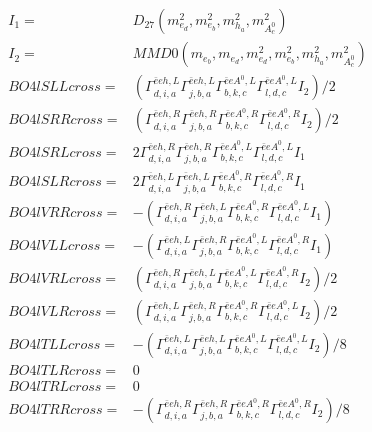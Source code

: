 \documentclass[A4,landscape]{article}
\begin{document}
\begin{align} 
I_1 = & D_{27}(m^2_{e_{{d}}}, m^2_{e_{{b}}}, m^2_{h_{{a}}}, m^2_{A^0_{{c}}}) \\ 
I_2 = & MMD0(m_{e_{{b}}}, m_{e_{{d}}}, m^2_{e_{{d}}}, m^2_{e_{{b}}}, m^2_{h_{{a}}}, m^2_{A^0_{{c}}}) \\ 
  BO4lSLLcross= & ( \Gamma^{\bar{e}e h ,L}_{d, i, a} \Gamma^{\bar{e}e h ,L}_{j, b, a} \Gamma^{\bar{e}e A^0 ,L}_{b, k, c} \Gamma^{\bar{e}e A^0 ,L}_{l, d, c} I_2)/2 \\ 
  BO4lSRRcross= & ( \Gamma^{\bar{e}e h ,R}_{d, i, a} \Gamma^{\bar{e}e h ,R}_{j, b, a} \Gamma^{\bar{e}e A^0 ,R}_{b, k, c} \Gamma^{\bar{e}e A^0 ,R}_{l, d, c} I_2)/2 \\ 
  BO4lSRLcross= & 2  \Gamma^{\bar{e}e h ,R}_{d, i, a} \Gamma^{\bar{e}e h ,R}_{j, b, a} \Gamma^{\bar{e}e A^0 ,L}_{b, k, c} \Gamma^{\bar{e}e A^0 ,L}_{l, d, c} I_1 \\ 
  BO4lSLRcross= & 2  \Gamma^{\bar{e}e h ,L}_{d, i, a} \Gamma^{\bar{e}e h ,L}_{j, b, a} \Gamma^{\bar{e}e A^0 ,R}_{b, k, c} \Gamma^{\bar{e}e A^0 ,R}_{l, d, c} I_1 \\ 
  BO4lVRRcross= & -( \Gamma^{\bar{e}e h ,R}_{d, i, a} \Gamma^{\bar{e}e h ,L}_{j, b, a} \Gamma^{\bar{e}e A^0 ,R}_{b, k, c} \Gamma^{\bar{e}e A^0 ,L}_{l, d, c} I_1) \\ 
  BO4lVLLcross= & -( \Gamma^{\bar{e}e h ,L}_{d, i, a} \Gamma^{\bar{e}e h ,R}_{j, b, a} \Gamma^{\bar{e}e A^0 ,L}_{b, k, c} \Gamma^{\bar{e}e A^0 ,R}_{l, d, c} I_1) \\ 
  BO4lVRLcross= & ( \Gamma^{\bar{e}e h ,R}_{d, i, a} \Gamma^{\bar{e}e h ,L}_{j, b, a} \Gamma^{\bar{e}e A^0 ,L}_{b, k, c} \Gamma^{\bar{e}e A^0 ,R}_{l, d, c} I_2)/2 \\ 
  BO4lVLRcross= & ( \Gamma^{\bar{e}e h ,L}_{d, i, a} \Gamma^{\bar{e}e h ,R}_{j, b, a} \Gamma^{\bar{e}e A^0 ,R}_{b, k, c} \Gamma^{\bar{e}e A^0 ,L}_{l, d, c} I_2)/2 \\ 
  BO4lTLLcross= & -( \Gamma^{\bar{e}e h ,L}_{d, i, a} \Gamma^{\bar{e}e h ,L}_{j, b, a} \Gamma^{\bar{e}e A^0 ,L}_{b, k, c} \Gamma^{\bar{e}e A^0 ,L}_{l, d, c} I_2)/8 \\ 
  BO4lTLRcross= & 0 \\ 
  BO4lTRLcross= & 0 \\ 
  BO4lTRRcross= & -( \Gamma^{\bar{e}e h ,R}_{d, i, a} \Gamma^{\bar{e}e h ,R}_{j, b, a} \Gamma^{\bar{e}e A^0 ,R}_{b, k, c} \Gamma^{\bar{e}e A^0 ,R}_{l, d, c} I_2)/8 \\ 
\end{align} 
\end{document}
